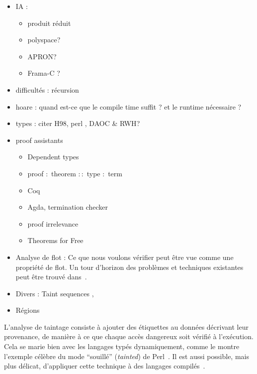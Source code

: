 \begin{itemize}
\item IA :

  \begin{itemize}
  \item produit réduit
  \item polyspace?
  \item APRON?
  \item Frama-C ?
  \end{itemize}

\item difficultés : récursion

\item
  hoare : quand est-ce que le compile time suffit ? et le runtime nécessaire ?
\item
  types : citer H98\cite{haskell98}, perl \cite{perlCamelBook}, DAOC\cite{DAOC}
  \& RWH\cite{rwh}?
\item proof assistants
  \begin{itemize}
  \item Dependent types
  \item proof $:$ theorem $::$ type $:$ term
  \item Coq
  \item Agda, termination checker
  \item proof irrelevance
  \item Theorems for Free\cite{theoremsforfree}
  \end{itemize}

\item
  Analyse de flot :
Ce que nous voulons vérifier peut être vue comme une propriété de flot. Un tour
d'horizon des problèmes et techniques existantes peut être trouvé
dans~\cite{sm-jsac03}.

\item Divers : Taint sequences \cite{mdv10},
\item Régions \cite{jfp92} \cite{popl94} \cite{ToTa1993}

\end{itemize}


L'analyse de taintage consiste à ajouter des étiquettes au données décrivant
leur provenance, de manière à ce que chaque accès dangereux soit vérifié à
l'exécution. Cela se marie bien avec les langages typés dynamiquement, comme le
montre l'exemple célèbre du mode ``souillé'' (\emph{tainted}) de
Perl~\cite{perlCamelBook}. Il est aussi possible, mais plus délicat, d'appliquer
cette technique à des langages compilés~\cite{clause-etal-issta07,oakland10}.

